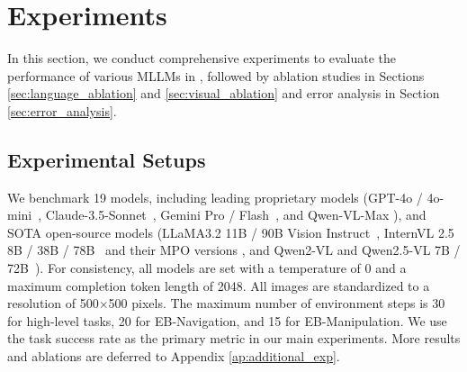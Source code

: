 \section{Experiments}




In this section, we conduct comprehensive experiments to evaluate the performance of various MLLMs in \name, followed by ablation studies in Sections \ref{sec:language_ablation} and \ref{sec:visual_ablation} and error analysis in Section \ref{sec:error_analysis}.

\vspace{-5pt}
\subsection{Experimental Setups}
\vspace{-5pt}


We benchmark 19 models, including leading proprietary models (GPT-4o / 4o-mini~\cite{GPT-4o,GPT-4o-mini}, Claude-3.5-Sonnet~\cite{Claude-3.5-Sonnet}, Gemini Pro / Flash~\cite{team2023gemini,team2024gemini,Gemini2.0}, and Qwen-VL-Max \cite{bai2023qwen}), and SOTA open-source models (LLaMA3.2 11B / 90B Vision Instruct~\cite{llama3.2}, InternVL 2.5 8B / 38B / 78B~\cite{internvl2.5} and their MPO versions \cite{wang2024enhancing}, and Qwen2-VL and Qwen2.5-VL 7B / 72B~\cite{wang2024qwen2,bai2025qwen25vl}). For consistency, all models are set with a temperature of 0 and a maximum completion token length of 2048. All images are standardized to a resolution of 500$\times$500 pixels. The maximum number of environment steps is 30 for high-level tasks, 20 for EB-Navigation, and 15 for EB-Manipulation. We use the task success rate as the primary metric in our main experiments. More results and ablations are deferred to Appendix \ref{ap:additional_exp}.



